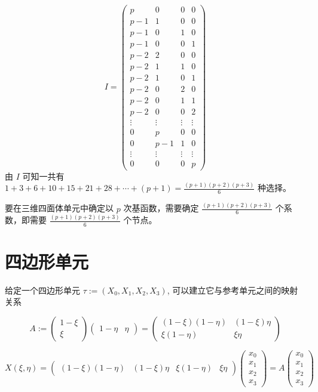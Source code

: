 \documentclass[12pt,a4paper]{article}
\begin{document}
$$
I = \begin{pmatrix}
p & 0 & 0 & 0\\
p-1 & 1 & 0 & 0\\
p-1 & 0 & 1 & 0\\
p-1 & 0 & 0 & 1\\
p-2 & 2 & 0 & 0\\
p-2 & 1 & 1 & 0\\
p-2 & 1 & 0 & 1\\
p-2 & 0 & 2 & 0 \\
p-2 & 0 & 1 & 1 \\
p-2 & 0 & 0 & 2\\
\vdots & \vdots & \vdots & \vdots \\
0   & p & 0 & 0 \\
0   & p-1 & 1 & 0\\
\vdots & \vdots & \vdots & \vdots \\
0   & 0  & 0 & p 
\end{pmatrix}
$$
由 $I$ 可知一共有 $1+3+6+10+15+21+28+\cdots+(p+1)=\frac{(p+1)(p+2)(p+3)}{6}$ 种选择。

要在三维四面体单元中确定以 $p$ 次基函数，需要确定 $\frac{(p+1)(p+2)(p+3)}{6}$ 个系数，即需要 $\frac{(p+1)(p+2)(p+3)}{6}$ 个节点。

\section{四边形单元}
给定一个四边形单元 $\tau := (X_0, X_1, X_2, X_3)$, 可以建立它与参考单元之间的映射关系

$$
A :=
\begin{pmatrix}
1 - \xi \\
\xi
\end{pmatrix}
\begin{pmatrix}
1 - \eta & \eta
\end{pmatrix}
= 
\begin{pmatrix}
(1-\xi)(1-\eta) & (1-\xi)\eta\\
\xi(1-\eta) & \xi\eta
\end{pmatrix}
$$

$$
X(\xi, \eta) =
\begin{pmatrix}
(1-\xi)(1-\eta) & (1-\xi)\eta & \xi(1-\eta) & 
\xi\eta
\end{pmatrix}
\begin{pmatrix}
x_0 \\ x_1 \\ x_2 \\ x_3
\end{pmatrix}=
A\begin{pmatrix}
x_0 \\ x_1 \\ x_2 \\ x_3
\end{pmatrix}
$$
\end{document}

